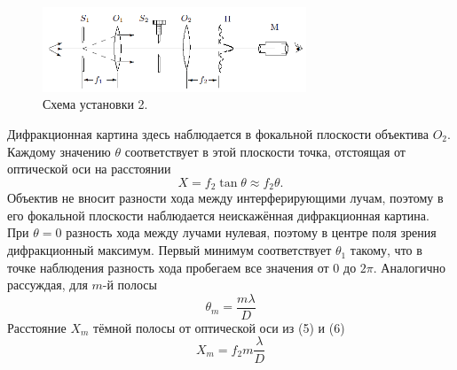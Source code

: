 \documentclass[a4paper,12pt]{article}
\begin{document}
\begin{figure}[h]
\includegraphics[width = 0.7\textwidth]{3.png}
\centering
\caption{Схема установки 2.}
\end{figure}
Дифракционная картина здесь наблюдается в фокальной плоскости объектива $O_2$. Каждому значению $\theta$ соответствует в этой плоскости точка, отстоящая от оптической оси на расстоянии 
\begin{equation}
X = f_2 \tan \theta \approx f_2 \theta.
\end{equation}
Объектив не вносит разности хода между интерферирующими лучам, поэтому в его фокальной плоскости наблюдается неискажённая дифракционная картина. При $\theta = 0$ разность хода между лучами нулевая, поэтому в центре поля зрения дифракционный максимум. Первый минимум соответствует $\theta_1$ такому, что в точке наблюдения разность хода пробегаем все значения от 0 до $2\pi$. Аналогично рассуждая, для $m$-й полосы
\begin{equation}
\theta_m = \frac{m \lambda}{D}
\end{equation}
Расстояние $X_m$ тёмной полосы от оптической оси из (5) и (6)
\begin{equation}
X_m = f_2m\frac{\lambda}{D}
\end{equation}
\end{document}
